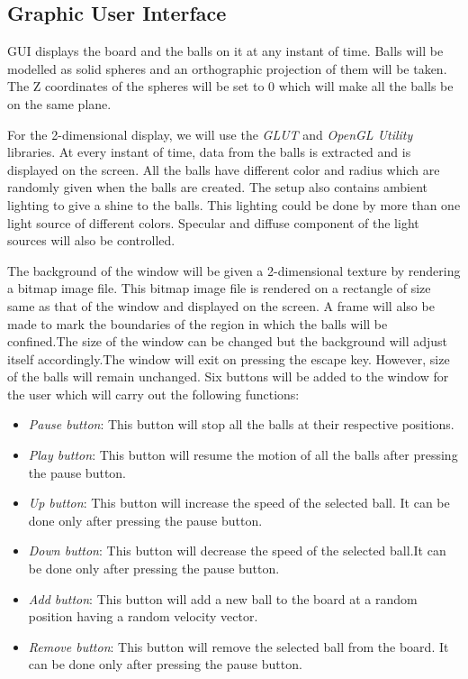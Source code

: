 \documentclass{article}
\begin{document}
\subsection{Graphic User Interface} GUI displays the board and the balls on it at any instant of time. Balls will be modelled as solid spheres and an orthographic projection of them will be taken. The Z coordinates of the spheres will be set to 0 which will make all the balls be on the same plane.
\par\noindent For the 2-dimensional display, we will use the \textit{GLUT} and \textit{OpenGL Utility} libraries. At every instant of time, data from the balls is extracted and is displayed on the screen. All the balls have different color and radius which are randomly given when the balls are created. The setup also contains ambient lighting to give a shine to the balls. This lighting could be done by more than one light source of different colors. Specular and diffuse component of the light sources will also be controlled.
\par\noindent The background of the window will be given a 2-dimensional texture by rendering a bitmap image file. This bitmap image file is rendered on a rectangle of size same as that of the window and displayed on the screen. A frame will also be made to mark the boundaries of the region in which the balls will be confined.The size of the window can be changed but the background will adjust itself accordingly.The window will exit on pressing the escape key. However, size of the balls will remain unchanged. Six buttons will be added to the window for the user which will carry out the following functions:

\begin{itemize}
\item \textit{Pause button}: This button will stop all the balls at their respective positions.
\item \textit{Play button}: This button will resume the motion of all the balls after pressing the pause button.
\item \textit{Up button}: This button will increase the speed of the selected ball. It can be done only after pressing the pause button.
\item \textit{Down button}: This button will decrease the speed of the selected ball.It can be done only after pressing the pause button.
\item \textit{Add button}: This button will add a new ball to the board at a random position having a random velocity vector.
\item \textit{Remove button}: This button will remove the selected ball from the board. It can be done only after pressing the pause button.

\end{itemize}
\end{document}
